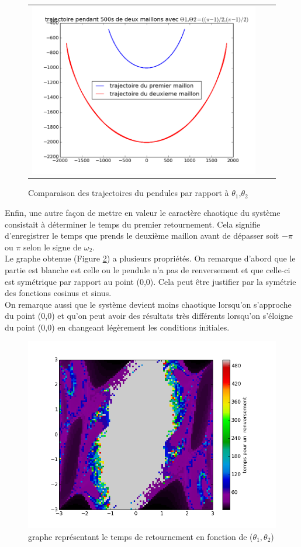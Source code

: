 \documentclass[a4paper,8pt,french,fleqn]{article}
\begin{document}
\begin{figure}[h]
\begin{tabular}{ccc}
\includegraphics[scale=0.29]{images/deux_maillon_2.png} 
\end{tabular}
\caption{Comparaison des trajectoires du pendules par rapport à $\theta_1$,$\theta_2$}
\label{Fig:3}
\end{figure}
Enfin, une autre façon de mettre en valeur le caractère chaotique du système consistait à déterminer le temps du premier retournement. Cela signifie d'enregistrer le temps que prends le deuxième maillon avant de dépasser soit $-\pi$ ou $\pi$ selon le signe de $\omega_2$.\\
Le graphe obtenue (Figure \ref{Fig:4}) a plusieurs propriétés. On remarque d’abord que le partie est blanche est celle ou le pendule n'a pas de renversement et que celle-ci est symétrique par rapport au point ($0$,$0$). Cela peut être justifier par la symétrie des fonctions cosinus et sinus.\\
On remarque aussi que le système devient moins chaotique lorsqu'on s'approche du point (0,0) et qu'on peut avoir des résultats très différents lorsqu'on s’éloigne du point ($0$,$0$) en changeant légèrement les conditions initiales.
\begin{figure}[h]
\centering
\includegraphics[scale=0.5]{images/map_renversement.png}
\caption{graphe représentant le temps de retournement en fonction de ($\theta_1,\theta_2$)}
\label{Fig:4}
\end{figure}
\end{document}
